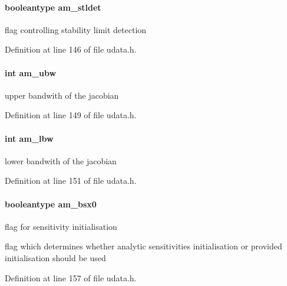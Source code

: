 \paragraph[{am\+\_\+stldet}]{\setlength{\rightskip}{0pt plus 5cm}booleantype am\+\_\+stldet}\label{struct_user_data_a7d39c238c319f0164a15744950bfd021}
flag controlling stability limit detection 

Definition at line 146 of file udata.\+h.

\hypertarget{struct_user_data_a7283826ef630f92bb04052eb79a377e5}{}
\paragraph[{am\+\_\+ubw}]{\setlength{\rightskip}{0pt plus 5cm}int am\+\_\+ubw}\label{struct_user_data_a7283826ef630f92bb04052eb79a377e5}
upper bandwith of the jacobian 

Definition at line 149 of file udata.\+h.

\hypertarget{struct_user_data_a0fd271dea83e804c7b1ef82a2b0ab76c}{}
\paragraph[{am\+\_\+lbw}]{\setlength{\rightskip}{0pt plus 5cm}int am\+\_\+lbw}\label{struct_user_data_a0fd271dea83e804c7b1ef82a2b0ab76c}
lower bandwith of the jacobian 

Definition at line 151 of file udata.\+h.

\hypertarget{struct_user_data_a87d2f917b1bea7fea2d5878ccd43c7db}{}
\paragraph[{am\+\_\+bsx0}]{\setlength{\rightskip}{0pt plus 5cm}booleantype am\+\_\+bsx0}\label{struct_user_data_a87d2f917b1bea7fea2d5878ccd43c7db}
flag for sensitivity initialisation

flag which determines whether analytic sensitivities initialisation or provided initialisation should be used 

Definition at line 157 of file udata.\+h.

\hypertarget{struct_user_data_a7ac27602345668b3a2bcabac4c7af733}{}
